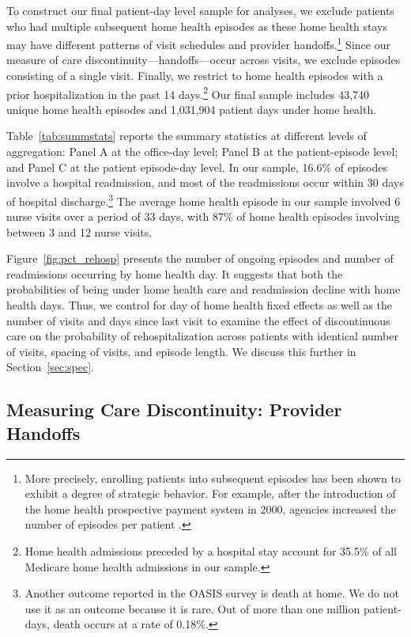 \documentclass[final,12pt, notitlepage]{article}
\begin{document}
To construct our final patient-day level sample for analyses, we exclude patients who had multiple subsequent home health episodes as these home health stays may have different patterns of visit schedules and provider handoffs.\footnote{More precisely, enrolling patients into subsequent episodes has been shown to exhibit a degree of strategic behavior. For example, after the introduction of the home health prospective payment system in 2000, agencies increased the number of episodes per patient \citep{Kim2015a}.}
Since our measure of care discontinuity---handoffs---occur across visits, we exclude episodes consisting of a single visit.
Finally,
we restrict to home health episodes with a prior hospitalization in the past 14 days.\footnote{Home health admissions preceded by a hospital stay account for 35.5\% of all Medicare home health admissions in our sample.
}
Our final sample includes 43,740 unique home health episodes and 1,031,904 patient days under home health.

Table~\ref{tab:summstats} reports the summary statistics at different levels of aggregation: Panel A at the office-day level; Panel B at the patient-episode level; and Panel C at the patient episode-day level. In our sample, 16.6\% of episodes involve a hospital readmission, and most of the readmissions occur within 30 days of hospital discharge.\footnote{Another outcome reported in the OASIS survey is death at home. We do not use it as an outcome because it is rare. Out of more than one million patient-days, death occurs at a rate of 0.18\%.}
The average home health episode in our sample involved 6 nurse visits over a period of 33 days, with 87\% of home health episodes involving between 3 and 12 nurse visits.


Figure~\ref{fig:pct_rehosp} presents the number of ongoing episodes and number of readmissions occurring by home health day.
It suggests that both the probabilities of being under home health care and readmission decline with home health days. Thus, we control for day of home health fixed effects as well as the number of visits and days since last visit to examine the effect of discontinuous care on the probability of rehospitalization across patients with identical number of visits, spacing of visits, and episode length. We discuss this further in Section~\ref{sec:spec}.


\subsection{Measuring Care Discontinuity: Provider Handoffs}\label{sec:measure_handoff}
\end{document}
